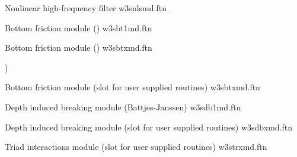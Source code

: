 \begin{flisti}
\end{flisti}

\vspace{\baselineskip}
\noindent
Nonlinear high-frequency filter \hfill {\file w3snlsmd.ftn}

\begin{flisti}
\end{flisti}

\pb \noindent
Bottom friction module (\js) \hfill {\file w3sbt1md.ftn}

\begin{flisti}
\end{flisti}

\noindent
Bottom friction module (\showex) \hfill {\file
w3sbtxmd.ftn}

\begin{flisti}
)
\end{flisti}

\noindent
Bottom friction module (slot for user supplied routines) \hfill {\file
w3sbtxmd.ftn}

\begin{flisti}
\end{flisti}

\noindent
Depth induced breaking module (Battjes-Janssen) \hfill {\file w3sdb1md.ftn}

\begin{flisti}
\end{flisti}

\noindent
Depth induced breaking module (slot for user supplied routines) \hfill {\file
w3sdbxmd.ftn}

\begin{flisti}
\end{flisti}

\noindent
Triad interactions module (slot for user supplied routines) \hfill {\file
w3strxmd.ftn}

